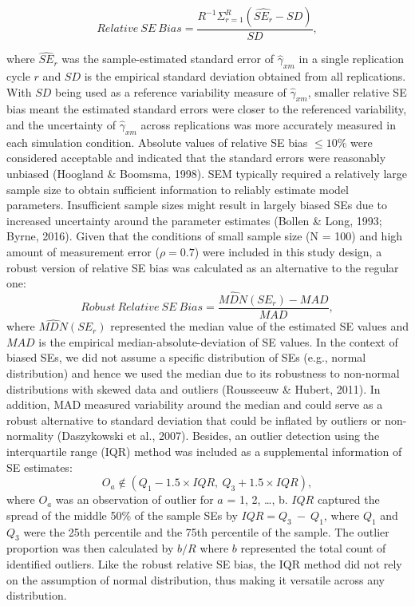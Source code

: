 \documentclass[
  man]{apa6}
\begin{document}
\begin{equation}
Relative\ SE\ Bias = \frac{R^{-1}\Sigma^{R}_{r = 1}(\widehat{SE_{r}} - SD)}{SD},
\end{equation}

where \(\widehat{SE}_{r}\) was the sample-estimated standard error of \(\hat{\gamma}_{xm}\) in a single replication cycle \(r\) and \(SD\) is the empirical standard deviation obtained from all replications. With \(SD\) being used as a reference variability measure of \(\hat{\gamma}_{xm}\), smaller relative SE bias meant the estimated standard errors were closer to the referenced variability, and the uncertainty of \(\hat{\gamma}_{xm}\) across replications was more accurately measured in each simulation condition. Absolute values of relative SE bias \(\le 10\%\) were considered acceptable and indicated that the standard errors were reasonably unbiased (Hoogland \(\&\) Boomsma, 1998).
SEM typically required a relatively large sample size to obtain sufficient information to reliably estimate model parameters. Insufficient sample sizes might result in largely biased SEs due to increased uncertainty around the parameter estimates (Bollen \& Long, 1993; Byrne, 2016). Given that the conditions of small sample size (N = 100) and high amount of measurement error (\(\rho = 0.7\)) were included in this study design, a robust version of relative SE bias was calculated as an alternative to the regular one:
\begin{equation}
Robust\ Relative\ SE\ Bias = \frac{\widehat{MDN}(SE_{r}) - MAD}{MAD},
\end{equation}
where \(\widehat{MDN}(SE_{r})\) represented the median value of the estimated SE values and \(MAD\) is the empirical median-absolute-deviation of SE values. In the context of biased SEs, we did not assume a specific distribution of SEs (e.g., normal distribution) and hence we used the median due to its robustness to non-normal distributions with skewed data and outliers (Rousseeuw \& Hubert, 2011). In addition, MAD measured variability around the median and could serve as a robust alternative to standard deviation that could be inflated by outliers or non-normality (Daszykowski et al., 2007).
Besides, an outlier detection using the interquartile range (IQR) method was included as a supplemental information of SE estimates:
\begin{equation}
O_{a} \not\in (Q_{1} - 1.5 \times IQR, \ Q_{3} + 1.5 \times IQR),
\end{equation}
where \(O_{a}\) was an observation of outlier for \(a\) = 1, 2, \ldots, b. \(IQR\) captured the spread of the middle 50\(\%\) of the sample SEs by \(IQR = Q_{3} \ - \ Q_{1}\), where \(Q_{1}\) and \(Q_{3}\) were the 25th percentile and the 75th percentile of the sample. The outlier proportion was then calculated by \(b/R\) where \(b\) represented the total count of identified outliers. Like the robust relative SE bias, the IQR method did not rely on the assumption of normal distribution, thus making it versatile across any distribution.
\end{document}
